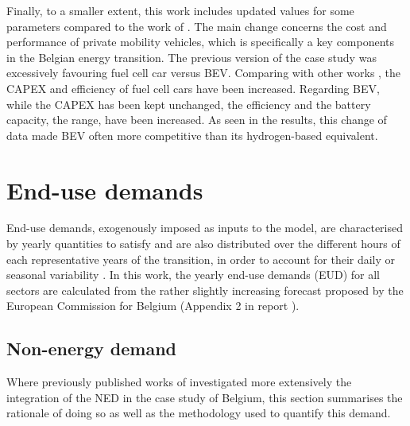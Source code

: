 Finally, to a smaller extent, this work includes updated values for some parameters compared to the work of \citet{limpens2021generating}. The main change concerns the cost and performance of private mobility vehicles, which is specifically a key components in the Belgian energy transition. The previous version of the case study was excessively favouring fuel cell car versus \gls{BEV}. Comparing with other works \cite{schnidrig2021modelling, EuropeanCommission2021}, the CAPEX and efficiency of fuel cell cars have been increased. Regarding \gls{BEV}, while the CAPEX has been kept unchanged, the efficiency and the battery capacity, \ie the range, have been increased. As seen in the results, this change of data made \gls{BEV} often more competitive than its hydrogen-based equivalent. 

\section{End-use demands}
\label{sec:cs:demand}
End-use demands, exogenously imposed as inputs to the model, are characterised by yearly quantities to satisfy and are also distributed over the different hours of each representative years of the transition, in order to account for their daily or seasonal variability \cite{Limpens2020,limpens2021generating}. In this work, the yearly end-use demands (EUD) for all sectors are calculated from the rather slightly increasing forecast proposed by the European Commission for Belgium (Appendix 2 in report \cite{EuropeanCommission2021}). 

\subsection{Non-energy demand}
\label{subsec:cs:NED}
Where previously published works of \citet{rixhon2021comprehensive,rixhon2022integration} investigated more extensively the integration of the \gls{NED} in the case study of Belgium, this section summarises the rationale of doing so as well as the methodology used to quantify this demand.\\

\\

